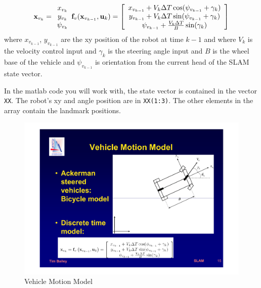 \documentclass[a4, 10pt]{article}
\begin{document}
\begin{equation}
\mathbf{x}_{v_k} = 
\begin{array}{c}
x_{v_{k}}\\
y_{v_{k}}\\
\psi_{v_{k}}
\end{array}
\mathbf{f}_v(\mathbf{x}_{v_{k-1}}, \mathbf{u}_k) = \left[
\begin{array}{c}
x_{v_{k-1}} + V_k \Delta T \cos(\psi_{v_{k-1}} + \gamma_k) \\
y_{v_{k-1}} + V_k \Delta T \sin(\psi_{v_{k-1}} + \gamma_k) \\
\psi_{v_{k-1}} + {V_k \Delta T \over B} \sin(\gamma_k)
\end{array}
\right]
\end{equation}
where $x_{v_{k-1}}$, $y_{v_{k-1}}$ are the xy position of the robot at time
$k-1$ and
where $V_k$ is the velocity control input and $\gamma_k$ is the
steering angle input and $B$ is the wheel base of the vehicle and
$\psi_{v_{k-1}} $ is orientation from the current head of the SLAM
state vector. 

In the matlab code you will work with, the state vector is contained
in the vector \verb|XX|. The robot's xy and angle position are in
\verb|XX(1:3)|. The other elements in the array contain the landmark
positions.

\begin{figure}[h]
\begin{center}
\includegraphics[]{vehmodel}
\caption{Vehicle Motion Model}
\label{f:motion}
\end{center}
\end{figure}
\end{document}
